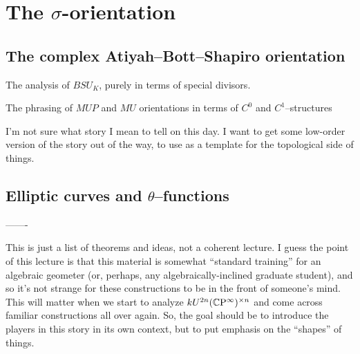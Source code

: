 
\chapter{The $\sigma$-orientation}\label{ChapterSigmaOrientation}








\section{The complex Atiyah--Bott--Shapiro orientation}

The analysis of $BSU_K$, purely in terms of special divisors.

The phrasing of $MUP$ and $MU$ orientations in terms of $C^0$ and $C^1$--structures


I'm not sure what story I mean to tell on this day.  I want to get some low-order version of the story out of the way, to use as a template for the topological side of things.





\section{Elliptic curves and $\theta$--functions}

-------

This is just a list of theorems and ideas, not a coherent lecture.  I guess the point of this lecture is that this material is somewhat ``standard training'' for an algebraic geometer (or, perhaps, any algebraically-inclined graduate student), and so it's not strange for these constructions to be in the front of someone's mind.  This will matter when we start to analyze $kU^{2n}(\mathbb{C}\mathrm P^\infty)^{\times n}$ and come across familiar constructions all over again.  So, the goal should be to introduce the players in this story in its own context, but to put emphasis on the ``shapes'' of things.

